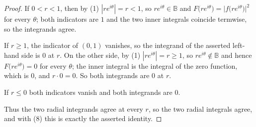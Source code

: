 \begin{proof}
If $0<r<1$, then by (1) $|re^{i\theta}|=r<1$, so $re^{i\theta}\in\mathbb{B}$
and $F\bigl(re^{i\theta}\bigr)=\bigl|f\bigl(re^{i\theta}\bigr)\bigr|^{2}$ for
every $\theta$; both indicators are $1$ and the two inner integrals coincide
termwise, so the integrands agree.

If $r\ge1$, the indicator of $(0,1)$ vanishes, so the integrand of the
asserted left-hand side is $0$ at $r$.  On the other side, by (1)
$|re^{i\theta}|=r\ge1$, so $re^{i\theta}\notin\mathbb{B}$ and hence
$F\bigl(re^{i\theta}\bigr)=0$ for every $\theta$; the inner integral is the
integral of the zero function, which is $0$, and $r\cdot0=0$.  So both
integrands are $0$ at $r$.

If $r\le0$ both indicators vanish and both integrands are $0$.

Thus the two radial integrands agree at every $r$, so the two radial integrals
agree, and with (8) this is exactly the asserted identity.
\end{proof}
